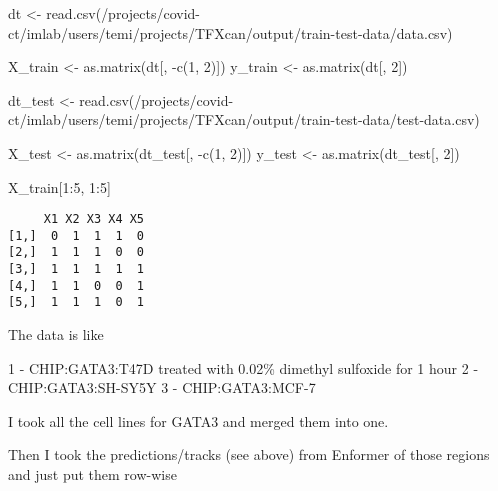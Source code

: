 \documentclass[
  letterpaper,
  DIV=11,
  numbers=noendperiod]{scrartcl}
\newenvironment{Shaded}{\begin{snugshade}}{\end{snugshade}}
\newcommand{\DecValTok}[1]{\textcolor[rgb]{0.68,0.00,0.00}{#1}}
\newcommand{\FunctionTok}[1]{\textcolor[rgb]{0.28,0.35,0.67}{#1}}
\newcommand{\NormalTok}[1]{\textcolor[rgb]{0.00,0.23,0.31}{#1}}
\newcommand{\OtherTok}[1]{\textcolor[rgb]{0.00,0.23,0.31}{#1}}
\newcommand{\SpecialCharTok}[1]{\textcolor[rgb]{0.37,0.37,0.37}{#1}}
\newcommand{\StringTok}[1]{\textcolor[rgb]{0.13,0.47,0.30}{#1}}
\begin{document}
\begin{Shaded}
\begin{Highlighting}[]
\NormalTok{dt }\OtherTok{\textless{}{-}} \FunctionTok{read.csv}\NormalTok{(}\StringTok{\textquotesingle{}/projects/covid{-}ct/imlab/users/temi/projects/TFXcan/output/train{-}test{-}data/data.csv\textquotesingle{}}\NormalTok{)}

\NormalTok{X\_train }\OtherTok{\textless{}{-}} \FunctionTok{as.matrix}\NormalTok{(dt[, }\SpecialCharTok{{-}}\FunctionTok{c}\NormalTok{(}\DecValTok{1}\NormalTok{, }\DecValTok{2}\NormalTok{)])}
\NormalTok{y\_train }\OtherTok{\textless{}{-}} \FunctionTok{as.matrix}\NormalTok{(dt[, }\DecValTok{2}\NormalTok{])}

\NormalTok{dt\_test }\OtherTok{\textless{}{-}} \FunctionTok{read.csv}\NormalTok{(}\StringTok{\textquotesingle{}/projects/covid{-}ct/imlab/users/temi/projects/TFXcan/output/train{-}test{-}data/test{-}data.csv\textquotesingle{}}\NormalTok{)}

\NormalTok{X\_test }\OtherTok{\textless{}{-}} \FunctionTok{as.matrix}\NormalTok{(dt\_test[, }\SpecialCharTok{{-}}\FunctionTok{c}\NormalTok{(}\DecValTok{1}\NormalTok{, }\DecValTok{2}\NormalTok{)])}
\NormalTok{y\_test }\OtherTok{\textless{}{-}} \FunctionTok{as.matrix}\NormalTok{(dt\_test[, }\DecValTok{2}\NormalTok{])}
\end{Highlighting}
\end{Shaded}

\begin{Shaded}
\begin{Highlighting}[]
\NormalTok{X\_train[}\DecValTok{1}\SpecialCharTok{:}\DecValTok{5}\NormalTok{, }\DecValTok{1}\SpecialCharTok{:}\DecValTok{5}\NormalTok{]}
\end{Highlighting}
\end{Shaded}

\begin{verbatim}
     X1 X2 X3 X4 X5
[1,]  0  1  1  1  0
[2,]  1  1  1  0  0
[3,]  1  1  1  1  1
[4,]  1  1  0  0  1
[5,]  1  1  1  0  1
\end{verbatim}

The data is like

1 - CHIP:GATA3:T47D treated with 0.02\% dimethyl sulfoxide for 1 hour 2
- CHIP:GATA3:SH-SY5Y 3 - CHIP:GATA3:MCF-7

I took all the cell lines for GATA3 and merged them into one.

Then I took the predictions/tracks (see above) from Enformer of those
regions and just put them row-wise
\end{document}
